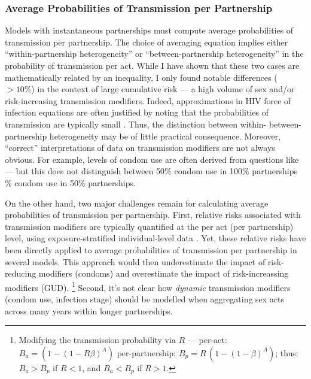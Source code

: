 \subsubsection{Average Probabilities of Transmission per Partnership}
Models with instantaneous partnerships must compute
average probabilities of transmission per partnership.
The choice of averaging equation implies either
``within-partnership heterogeneity'' or ``between-partnership heterogeneity''
in the probability of transmission per act.
While I have shown that these two cases are mathematically related by an inequality,
I only found notable differences (\eg~$>10\%$) in the context of large cumulative risk
--- \eg a high volume of sex and/or risk-increasing transmission modifiers.
Indeed, approximations in HIV force of infection equations are often justified by noting that
the probabilities of transmission are typically small \cite{Kerr2015}.
Thus, the distinction between within- \vs between-partnership heterogeneity
may be of little practical consequence.
Moreover, ``correct'' interpretations of data on transmission modifiers are not always obvious.
For example, levels of condom use are often derived from questions like
--- but this does not distinguish between
50\% condom use in 100\% partnerships \% condom use in 50\% partnerships.
\par
On the other hand, two major challenges remain for
calculating average probabilities of transmission per partnership.
First, relative risks associated with transmission modifiers
are typically quantified at the per act (\vs per partnership) level, using
exposure-stratified individual-level data \cite{Jewell1990,Gray2001,Wawer2005,Boily2009}.
Yet, these relative risks have been directly applied to
average probabilities of transmission per partnership in several models.
This approach would then
underestimate the impact of risk-reducing modifiers (\eg condoms) and
overestimate the impact of risk-increassing modifiers (\eg GUD).%
\footnote{Modifying the transmission probability via $R$ ---
  per-act: $B_a = (1 - {(1 - R\beta)}^A)$ \vs per-partnership: $B_p = R\,(1 - {(1 - \beta)}^A)$;
  thus: $B_a > B_p$ if $R < 1$, and $B_a < B_p$ if $R > 1$.}
Second, it's not clear how \emph{dynamic} transmission modifiers (\eg condom use, infection stage)
should be modelled when aggregating sex acts across many years within longer partnerships.
